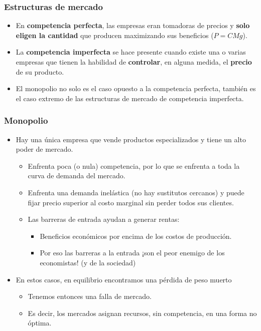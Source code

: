 \documentclass{beamer}
\begin{document}
\begin{frame}
\frametitle{Estructuras de mercado}
  \begin{itemize} 
    \item En \textbf{competencia perfecta}, las empresas eran tomadoras de precios y \textbf{solo eligen la cantidad} que producen maximizando sus beneficios ($P=CMg$). \vspace{1mm}
     \item  La \textbf{competencia imperfecta} se hace presente cuando existe una o varias empresas que tienen la habilidad de \textbf{controlar}, en alguna medida, el \textbf{precio} de su producto. \vspace{1mm}
     \item El monopolio no solo es el caso opuesto a la competencia perfecta, también es el caso extremo de las estructuras de mercado de competencia imperfecta. \vspace{1mm}
  \end{itemize} 
\end{frame}
\begin{frame}
\frametitle{Monopolio}
\begin{itemize}
    \item Hay una única empresa que vende productos especializados y tiene un alto poder de mercado. \vspace{1mm}
    \begin{itemize}
        \item Enfrenta poca (o nula) competencia, por lo que se enfrenta  a toda la curva de demanda del mercado.
       \item Enfrenta una demanda inelástica (no hay sustitutos cercanos) y puede fijar precio superior al costo marginal sin perder todos sus clientes. \vspace{1mm}
        \item Las barreras de entrada ayudan a generar rentas: 
            \begin{itemize}
               \item Beneficios económicos por encima de los costos de producción.
                \item Por eso las barreras a la entrada ¡son el peor enemigo de los economistas! (y de la sociedad)
            \end{itemize}
    \end{itemize}
    \vspace{1.5mm}
    \item En estos casos, en equilibrio encontramos una pérdida de peso muerto 
    \vspace{-4mm}
    \begin{itemize}
        \item Tenemos entonces una falla de mercado.
        \item Es decir, los mercados asignan recursos, sin competencia, en una forma no óptima. 
    \end{itemize}
    \end{itemize}
\end{frame}
\end{document}
